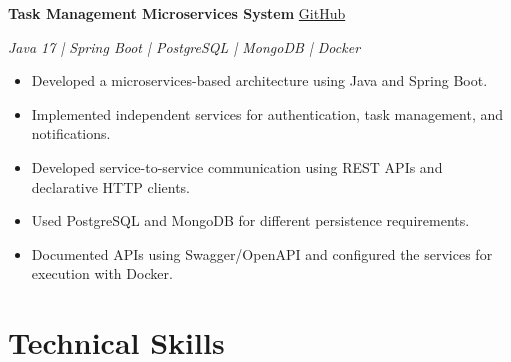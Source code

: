 \documentclass[a4paper,10pt]{article}
\begin{document}
\vspace{0.01cm}

\textbf{Task Management Microservices System}
\hfill
\href{https://github.com/username/microservices}{GitHub}

\textit{Java 17 | Spring Boot | PostgreSQL | MongoDB | Docker}

\begin{itemize}

    \item Developed a microservices-based architecture using Java and Spring Boot.

    \item Implemented independent services for authentication, task management, and notifications.

    \item Developed service-to-service communication using REST APIs and declarative HTTP clients.

    \item Used PostgreSQL and MongoDB for different persistence requirements.

    \item Documented APIs using Swagger/OpenAPI and configured the services for execution with Docker.

\end{itemize}


\section{Technical Skills}
\end{document}
